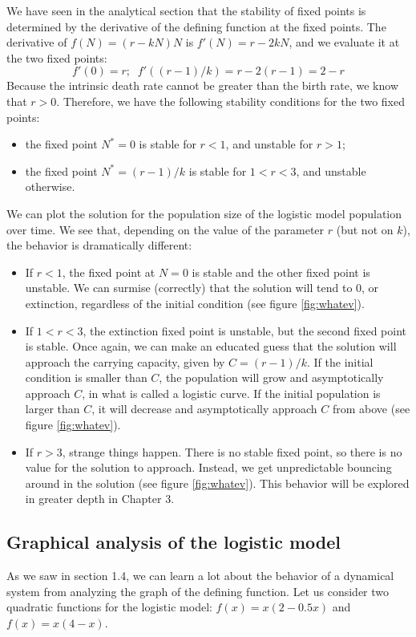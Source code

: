 \documentclass[11pt]{book}
\begin{document}
We have seen in the analytical section that the stability of fixed points is determined by the derivative of the defining function at the fixed points. The derivative of $f(N) = (r-kN)N$ is $f'(N) = r-2kN$, and we evaluate it at the two fixed points:
$$f'(0) = r; \; \; f'((r-1)/k) = r-2(r-1) = 2-r$$
Because the intrinsic death rate cannot be greater than the birth rate, we know that $r>0$. Therefore, we have the following stability conditions for the two fixed points:
\begin{itemize}
\item the fixed point $N^*=0$ is stable for $r<1$, and unstable for $r>1$;
\item the fixed point $N^*= (r-1)/k$ is stable for $1<r<3$, and unstable otherwise.
\end{itemize}
We can plot the solution for the population size of the logistic model population over time. We see that, depending on the value of the parameter $r$ (but not on $k$), the behavior is dramatically different:
\begin{itemize}
\item If $r < 1$, the fixed point at $N = 0$ is stable and the other fixed point is unstable. We can surmise (correctly) that the solution will tend to 0, or extinction, regardless of the initial condition (see figure \ref{fig:whatev}).

\item If $1 < r < 3$, the extinction fixed point is unstable, but the second fixed point is stable. Once again, we can make an educated guess that the solution will approach the carrying capacity, given by $C = (r-1)/k$. If the initial condition is smaller than $C$, the population will grow and asymptotically approach $C$, in what is called a logistic curve. If the initial population is larger than $C$, it will decrease and asymptotically approach $C$ from above (see figure \ref{fig:whatev}).

\item If $ r > 3$, strange things happen. There is no stable fixed point, so there is no value for the solution to approach. Instead, we get unpredictable bouncing around in the solution (see figure \ref{fig:whatev}). This behavior will be explored in greater depth in Chapter 3.
\end{itemize}

\subsection{Graphical analysis of the logistic model}
As we saw in section 1.4, we can learn a lot about the behavior of a dynamical system from analyzing the graph of the defining function. Let us consider two quadratic functions for the logistic model: $ f(x) = x(2-0.5x)$ and $f(x) = x(4-x)$.
\end{document}
